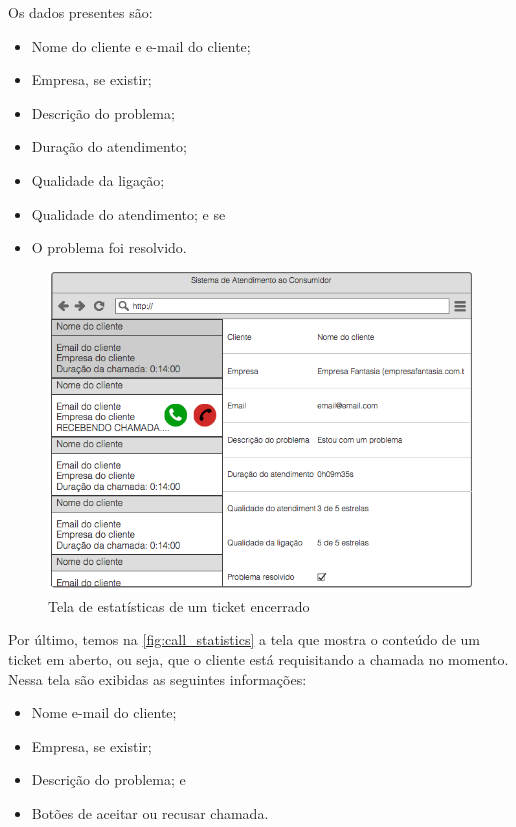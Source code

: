 Os dados presentes são:

\begin{itemize}
  \item Nome do cliente e e-mail do cliente;
  \item Empresa, se existir;
  \item Descrição do problema;
  \item Duração do atendimento;
  \item Qualidade da ligação;
  \item Qualidade do atendimento; e se
  \item O problema foi resolvido.
\end{itemize}

\begin{figure}[!htb]
	\centering
    \includegraphics[scale=0.4]{figures/prototypes/ticket-statistics.png} 
	\caption{Tela de estatísticas de um ticket encerrado}
	\label{fig:ticket_statistics}
\end{figure}

Por último, temos na \autoref{fig:call_statistics} a tela que mostra o conteúdo de um ticket em aberto, ou seja, que o cliente está requisitando a chamada no momento. Nessa tela são exibidas as seguintes informações:

\begin{itemize}
	\item Nome e-mail do cliente;
    \item Empresa, se existir;
    \item Descrição do problema; e
    \item Botões de aceitar ou recusar chamada.
\end{itemize}

